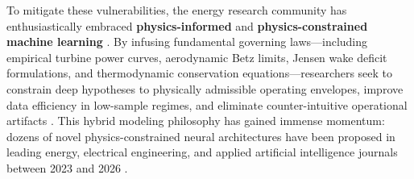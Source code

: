 \documentclass[preprint,3p,times]{elsarticle}
\begin{document}
To mitigate these vulnerabilities, the energy research community has enthusiastically embraced \textbf{physics-informed} and \textbf{physics-constrained machine learning} \cite{raissi2019physics,karniadakis2021physics}. By infusing fundamental governing laws---including empirical turbine power curves, aerodynamic Betz limits, Jensen wake deficit formulations, and thermodynamic conservation equations---researchers seek to constrain deep hypotheses to physically admissible operating envelopes, improve data efficiency in low-sample regimes, and eliminate counter-intuitive operational artifacts \cite{sheng2025annreview}. This hybrid modeling philosophy has gained immense momentum: dozens of novel physics-constrained neural architectures have been proposed in leading energy, electrical engineering, and applied artificial intelligence journals between 2023 and 2026 \cite{tgdpf2025,pct2026}.
\end{document}
